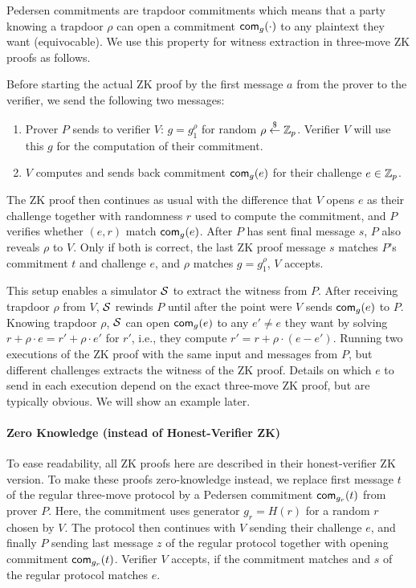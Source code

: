 Pedersen commitments are trapdoor commitments which means that a party
knowing a trapdoor $\rho$ can open a commitment $\mathsf{com}_g(\cdot)$ to any
plaintext they want (equivocable).  We use this property for witness
extraction in three-move ZK proofs as follows.

Before starting the actual ZK proof by the first message $a$ from the
prover to the verifier, we send the following two messages:
\begin{enumerate}
\item Prover $P$ sends to verifier $V$: $g=g_1^\rho$ for random
  $\rho\stackrel{\$}{\leftarrow}\mathbb{Z}_p$. Verifier $V$ will use this $g$ for the computation
  of their commitment.
  \item $V$ computes and sends back commitment $\mathsf{com}_g(e)$ for their
    challenge $e\in\mathbb{Z}_p$.
\end{enumerate}

The ZK proof then continues as usual with the difference that $V$
opens $e$ as their challenge together with randomness $r$ used to
compute the commitment, and $P$ verifies whether $(e,r)$ match
$\mathsf{com}_g(e)$.  After $P$ has sent final message $s$, $P$ also
reveals $\rho$ to $V$. Only if both is correct, the last ZK proof
message $s$ matches $P$'s commitment $t$ and challenge $e$, and $\rho$
matches $g=g_1^\rho$, $V$ accepts.

This setup enables a simulator ${\mathcal{S}}$ to extract the witness from
$P$. After receiving trapdoor $\rho$ from $V$, ${\mathcal{S}}$ rewinds $P$ until
after the point were $V$ sends $\mathsf{com}_g(e)$ to $P$. Knowing trapdoor
$\rho$, ${\mathcal{S}}$ can open $\mathsf{com}_g(e)$ to any $e'\neq{}e$ they want by
solving $r+\rho\cdot{}e=r'+\rho\cdot{}e'$ for $r'$, i.e., they compute
$r'=r+\rho\cdot{}(e-e')$. Running two executions of the ZK proof with the
same input and messages from $P$, but different challenges extracts
the witness of the ZK proof. Details on which $e$ to send in each
execution depend on the exact three-move ZK proof, but are typically
obvious. We will show an example later.

\paragraph{Zero Knowledge (instead of Honest-Verifier ZK)}
To ease readability, all ZK proofs here are described in their
honest-verifier ZK version. To make these proofs zero-knowledge
instead, we replace first message $t$ of the regular three-move
protocol by a Pedersen commitment $\mathsf{com}_{g_r}(t)$ from prover
$P$. Here, the commitment uses generator $g_r=H(r)$ for a random $r$
chosen by $V$. The protocol then continues with $V$ sending their
challenge $e$, and finally $P$ sending last message $z$ of the regular
protocol together with opening commitment $\mathsf{com}_{g_r}(t)$. Verifier
$V$ accepts, if the commitment matches and $s$ of the regular protocol
matches $e$.

